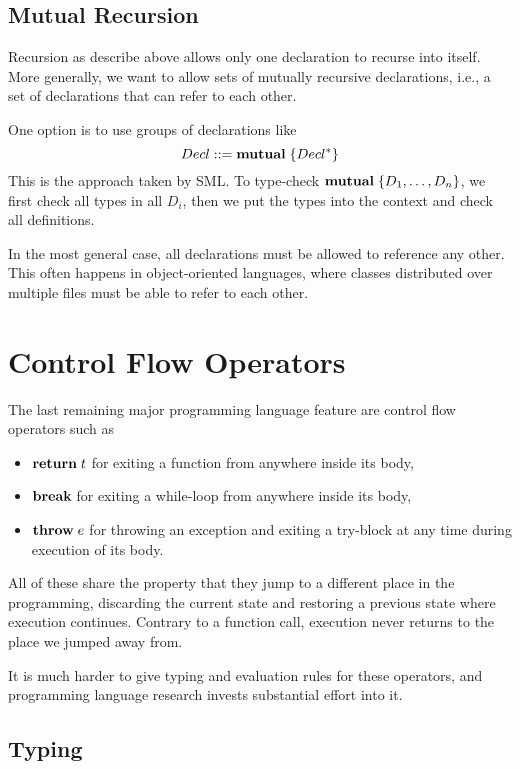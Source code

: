 \subsection{Mutual Recursion}

Recursion as describe above allows only one declaration to recurse into itself.
More generally, we want to allow sets of mutually recursive declarations, i.e., a set of declarations that can refer to each other.

One option is to use groups of declarations like
\[Decl ::= {\rm \bf mutual}\;\{Decl^*\}\]
This is the approach taken by SML.
To type-check ${\rm \bf mutual}\;\{D_1,\ldots,D_n\}$, we first check all types in all $D_i$, then we put the types into the context and check all definitions.

In the most general case, all declarations must be allowed to reference any other.
This often happens in object-oriented languages, where classes distributed over multiple files must be able to refer to each other.


\section{Control Flow Operators}

The last remaining major programming language feature are control flow operators such as
\begin{itemize}
  \item $\areturn{t}$ for exiting a function from anywhere inside its body,
  \item $\abreak$ for exiting a while-loop from anywhere inside its body,
  \item $\athrow{e}$ for throwing an exception and exiting a try-block at any time during execution of its body.
\end{itemize}

All of these share the property that they jump to a different place in the programming, discarding the current state and restoring a previous state where execution continues.
Contrary to a function call, execution never returns to the place we jumped away from.

It is much harder to give typing and evaluation rules for these operators, and programming language research invests substantial effort into it.

\subsection{Typing}

